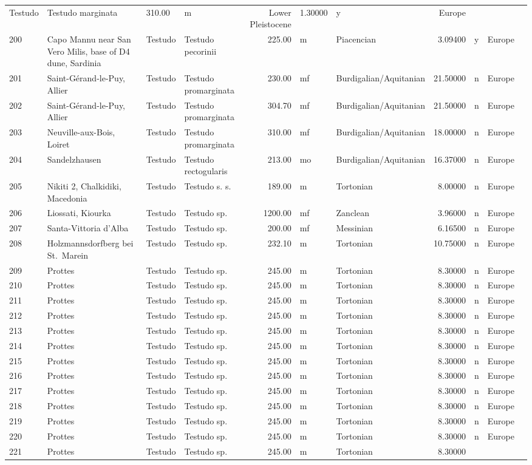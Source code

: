 \begin{landscape}
{\begin{longtable}[]{@{}llllrllrlll@{}}
	Testudo & Testudo marginata & 310.00 & m & Lower Pleistocene & 1.30000 &
	y & Europe\tabularnewline
	200 & Capo Mannu near San Vero Milis, base of D4 dune, Sardinia &
	Testudo & Testudo pecorinii & 225.00 & m & Piacencian & 3.09400 & y &
	Europe\tabularnewline
	201 & Saint-Gérand-le-Puy, Allier & Testudo & Testudo promarginata &
	230.00 & mf & Burdigalian/Aquitanian & 21.50000 & n &
	Europe\tabularnewline
	202 & Saint-Gérand-le-Puy, Allier & Testudo & Testudo promarginata &
	304.70 & mf & Burdigalian/Aquitanian & 21.50000 & n &
	Europe\tabularnewline
	203 & Neuville-aux-Bois, Loiret & Testudo & Testudo promarginata &
	310.00 & mf & Burdigalian/Aquitanian & 18.00000 & n &
	Europe\tabularnewline
	204 & Sandelzhausen & Testudo & Testudo rectogularis & 213.00 & mo &
	Burdigalian/Aquitanian & 16.37000 & n & Europe\tabularnewline
	205 & Nikiti 2, Chalkidiki, Macedonia & Testudo & Testudo s. s. & 189.00
	& m & Tortonian & 8.00000 & n & Europe\tabularnewline
	206 & Liossati, Kiourka & Testudo & Testudo sp. & 1200.00 & mf &
	Zanclean & 3.96000 & n & Europe\tabularnewline
	207 & Santa-Vittoria d'Alba & Testudo & Testudo sp. & 200.00 & mf &
	Messinian & 6.16500 & n & Europe\tabularnewline
	208 & Holzmannsdorfberg bei St.~Marein & Testudo & Testudo sp. & 232.10
	& m & Tortonian & 10.75000 & n & Europe\tabularnewline
	209 & Prottes & Testudo & Testudo sp. & 245.00 & m & Tortonian & 8.30000
	& n & Europe\tabularnewline
	210 & Prottes & Testudo & Testudo sp. & 245.00 & m & Tortonian & 8.30000
	& n & Europe\tabularnewline
	211 & Prottes & Testudo & Testudo sp. & 245.00 & m & Tortonian & 8.30000
	& n & Europe\tabularnewline
	212 & Prottes & Testudo & Testudo sp. & 245.00 & m & Tortonian & 8.30000
	& n & Europe\tabularnewline
	213 & Prottes & Testudo & Testudo sp. & 245.00 & m & Tortonian & 8.30000
	& n & Europe\tabularnewline
	214 & Prottes & Testudo & Testudo sp. & 245.00 & m & Tortonian & 8.30000
	& n & Europe\tabularnewline
	215 & Prottes & Testudo & Testudo sp. & 245.00 & m & Tortonian & 8.30000
	& n & Europe\tabularnewline
	216 & Prottes & Testudo & Testudo sp. & 245.00 & m & Tortonian & 8.30000
	& n & Europe\tabularnewline
	217 & Prottes & Testudo & Testudo sp. & 245.00 & m & Tortonian & 8.30000
	& n & Europe\tabularnewline
	218 & Prottes & Testudo & Testudo sp. & 245.00 & m & Tortonian & 8.30000
	& n & Europe\tabularnewline
	219 & Prottes & Testudo & Testudo sp. & 245.00 & m & Tortonian & 8.30000
	& n & Europe\tabularnewline
	220 & Prottes & Testudo & Testudo sp. & 245.00 & m & Tortonian & 8.30000
	& n & Europe\tabularnewline
	221 & Prottes & Testudo & Testudo sp. & 245.00 & m & Tortonian & 8.30000

\end{longtable}}
\end{landscape}

